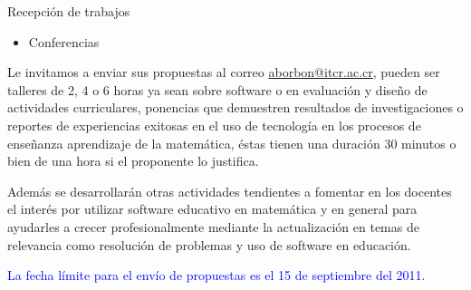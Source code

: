 \documentclass[svgnames,table, x11names, 11pt]{beamer}
\begin{document}
\begin{frame}[fragile]{}
\begin{columns}[t]
\begin{column}{0.66\textwidth}
\begin{columns}[t]
\begin{column}{0.5\textwidth}
\begin{block}{Recepción de trabajos}
\begin{itemize}
\item Conferencias
\end{itemize}

Le invitamos a enviar sus propuestas al correo \url{aborbon@itcr.ac.cr}, pueden ser talleres de 2, 4 o 6 horas ya sean sobre software o en evaluación  y diseño de actividades curriculares, ponencias que demuestren resultados de investigaciones o reportes de experiencias exitosas en el uso de tecnología en los procesos de enseñanza aprendizaje de la  matemática, éstas  tienen una duración  30 minutos o bien de una hora si el proponente lo justifica. 

Además se desarrollarán otras actividades tendientes a fomentar en los docentes el interés por utilizar software educativo en matemática y en general para ayudarles a crecer profesionalmente mediante la actualización en temas de relevancia como resolución de problemas y uso de software en educación. 

\textcolor{blue}{La fecha límite para el envío de propuestas es el 15  de septiembre del 2011.}
				\end{block}
			\end{column}
			

\end{columns}
\end{column}
\end{columns}
\end{frame}
\end{document}
